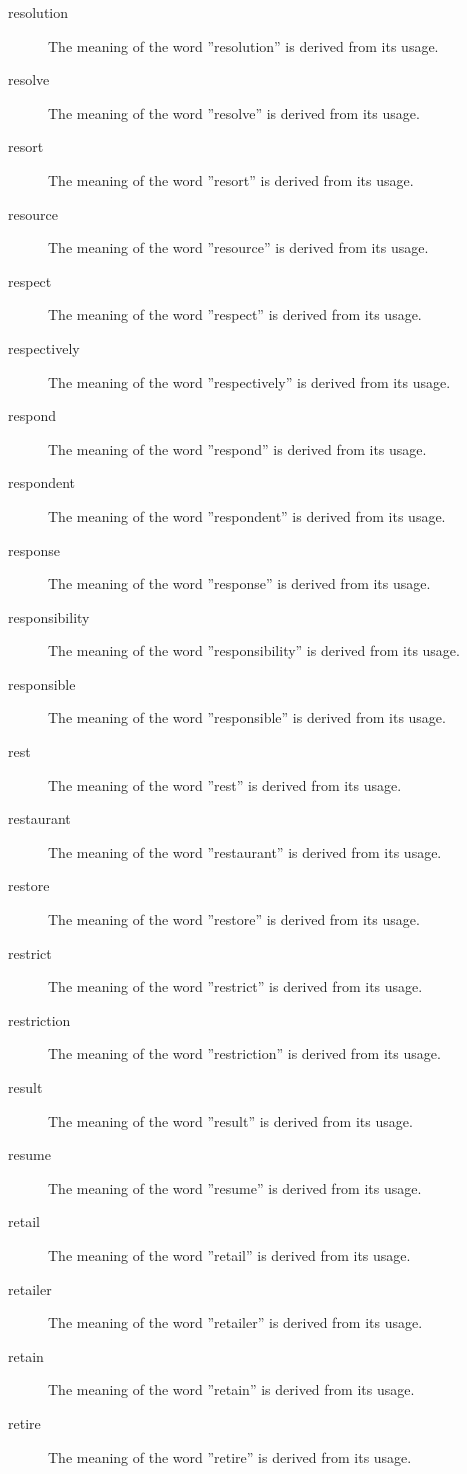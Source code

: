 \documentclass[12pt, letterpaper]{memoir}
\begin{document}
\begin{description}
\item[resolution] The meaning of the word ''resolution'' is derived from its usage.
\item[resolve] The meaning of the word ''resolve'' is derived from its usage.
\item[resort] The meaning of the word ''resort'' is derived from its usage.
\item[resource] The meaning of the word ''resource'' is derived from its usage.
\item[respect] The meaning of the word ''respect'' is derived from its usage.
\item[respectively] The meaning of the word ''respectively'' is derived from its usage.
\item[respond] The meaning of the word ''respond'' is derived from its usage.
\item[respondent] The meaning of the word ''respondent'' is derived from its usage.
\item[response] The meaning of the word ''response'' is derived from its usage.
\item[responsibility] The meaning of the word ''responsibility'' is derived from its usage.
\item[responsible] The meaning of the word ''responsible'' is derived from its usage.
\item[rest] The meaning of the word ''rest'' is derived from its usage.
\item[restaurant] The meaning of the word ''restaurant'' is derived from its usage.
\item[restore] The meaning of the word ''restore'' is derived from its usage.
\item[restrict] The meaning of the word ''restrict'' is derived from its usage.
\item[restriction] The meaning of the word ''restriction'' is derived from its usage.
\item[result] The meaning of the word ''result'' is derived from its usage.
\item[resume] The meaning of the word ''resume'' is derived from its usage.
\item[retail] The meaning of the word ''retail'' is derived from its usage.
\item[retailer] The meaning of the word ''retailer'' is derived from its usage.
\item[retain] The meaning of the word ''retain'' is derived from its usage.
\item[retire] The meaning of the word ''retire'' is derived from its usage.

\end{description}
\end{document}
